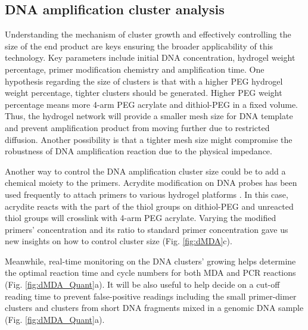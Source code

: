 \subsection{DNA amplification cluster analysis}
Understanding the mechanism of cluster growth and effectively controlling the size of the end product are keys ensuring the broader applicability of this technology. Key parameters include initial DNA concentration, hydrogel weight percentage, primer modification chemistry and amplification time. One hypothesis regarding the size of clusters is that with a higher PEG hydrogel weight percentage, tighter clusters should be generated. Higher PEG weight percentage means more 4-arm PEG acrylate and dithiol-PEG in a fixed volume. Thus, the hydrogel network will provide a smaller mesh size for DNA template and prevent amplification product from moving further due to restricted diffusion. Another possibility is that a tighter mesh size might compromise the robustness of DNA amplification reaction due to the physical impedance. 

Another way to control the DNA amplification cluster size could be to add a chemical moiety to the primers. Acrydite modification on DNA probes has been used frequently to attach primers to various hydrogel platforms \cite{Mitra:1999ty}. In this case, acrydite reacts with the part of the thiol groups on dithiol-PEG and unreacted thiol groups will crosslink with 4-arm PEG acrylate. Varying the modified primers' concentration and its ratio to standard primer concentration gave us new insights on how to control cluster size (Fig. \ref{fig:dMDA}c). 

Meanwhile, real-time monitoring on the DNA clusters' growing helps determine the optimal reaction time and cycle numbers for both MDA and PCR reactions (Fig. \ref{fig:dMDA_Quant}a). It will be also useful to help decide on a cut-off reading time to prevent false-positive readings including the small primer-dimer clusters and clusters from short DNA fragments mixed in a genomic DNA sample (Fig. \ref{fig:dMDA_Quant}a).

